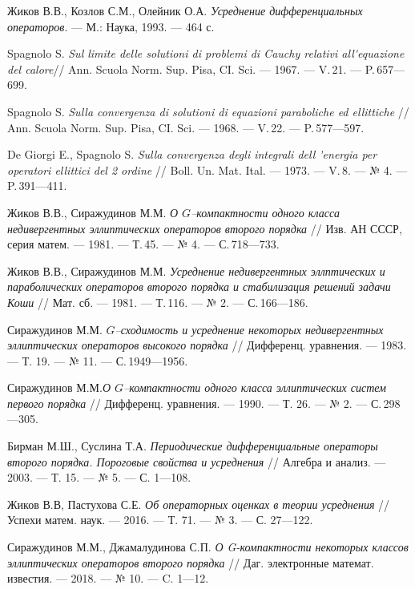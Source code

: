 \begin{thebibliography}{111}


Жиков В.В., Козлов С.М., Олейник О.А. \emph{Усреднение дифференциальных
операторов}. --- М.: Наука, 1993. --- 464 с.

Spagnolo S. \emph{Sul limite delle solutioni di problemi di Cauchy
relativi all\'{}equazione del calore}// Ann. Scuola Norm. Sup. Pisa, CI. Sci. --- 1967. --- V.\,21. --- P.\,657---699.

Spagnolo S. \emph{Sulla convergenza di solutioni di equazioni paraboliche ed ellittiche
} // Ann. Scuola Norm. Sup. Pisa, CI. Sci. --- 1968. --- V.\,22. --- P.\,577---597.

De Giorgi E., Spagnolo S. \emph{Sulla convergenza degli integrali dell \'{}energia
per operatori ellittici del 2 ordine} // Boll. Un. Mat. Ital. --- 1973. --- V.\,8. --- № 4. --- P.\,391---411.

Жиков В.В., Сиражудинов М.М. \emph{О $G$--компактности одного класса недивергентных
эллиптических операторов второго порядка} // Изв. АН СССР, серия матем.
--- 1981. --- Т.\,45. --- № 4. --- С.\,718---733.

Жиков В.В., Сиражудинов М.М. \emph{Усреднение недивергентных эллптических и
параболических операторов второго порядка и стабилизация решений задачи Коши} //
Мат. сб. --- 1981. --- Т.\,116. --- № 2. --- С.\,166---186.

Сиражудинов М.М. \emph{$G$--сходимость и усреднение некоторых недивергентных
эллиптических операторов высокого порядка} // Дифференц. уравнения. --- 1983.
--- Т. 19. --- № 11. --- С.\,1949---1956.

Сиражудинов М.М.\emph{О $G$--компактности одного класса эллиптических систем первого
порядка} // Дифференц. уравнения. --- 1990. --- Т. 26. --- № 2. --- С.\,298---305.

  Бирман М.Ш.,  Суслина Т.А.
\emph{Периодические дифференциальные операторы второго порядка.
Пороговые свойства и усреднения} //
Алгебра и анализ. --- 2003. --- Т. 15. --- № 5. --- С. 1---108.


  Жиков В.В,  Пастухова С.Е.
 \emph{Об операторных оценках в теории усреднения} //
Успехи матем. наук. --- 2016. --- Т. 71. --- № 3. --- С. 27---122.


Сиражудинов М.М., Джамалудинова С.П. \emph{О G-компактности некоторых классов эллиптических операторов второго порядка} // Даг. электронные математ. известия. --- 2018. --- № 10. --- C. 1---12.


\end{thebibliography}
